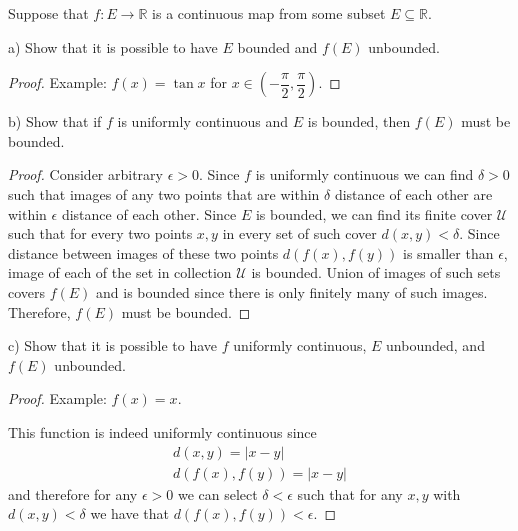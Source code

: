 \documentclass{article}
\newcommand{\R}{\mathbb{R}}
\begin{document}
\begin{tcolorbox}
Suppose that $f : E \to \R$ is a continuous map from some subset $E \subseteq \R$.

a) Show that it is possible to have $E$ bounded and $f(E)$ unbounded.
\end{tcolorbox}

\begin{proof}

Example: $f(x) = \tan x$ for $x \in \left( -\dfrac{\pi}{2}, \dfrac{\pi}{2} \right)$.

\end{proof}

\begin{tcolorbox}
b) Show that if $f$ is uniformly continuous and $E$ is bounded, then $f(E)$ must be bounded.
\end{tcolorbox}

\begin{proof}

Consider arbitrary $\epsilon>0$.
Since $f$ is uniformly continuous we can find $\delta>0$ such that images of any two points that are within $\delta$ distance of each other are within $\epsilon$ distance of each other.
Since $E$ is bounded, we can find its finite cover $\mathcal{U}$ such that for every two points $x,y$ in every set of such cover $d(x,y) < \delta$.
Since distance between images of these two points $d(f(x), f(y))$ is smaller than $\epsilon$, image of each of the set in collection $\mathcal{U}$ is bounded.
Union of images of such sets covers $f(E)$ and is bounded since there is only finitely many of such images.
Therefore, $f(E)$ must be bounded.

\end{proof}

\begin{tcolorbox}
c) Show that it is possible to have $f$ uniformly continuous, $E$ unbounded, and $f(E)$ unbounded.
\end{tcolorbox}

\begin{proof}

Example: $f(x) = x$.

This function is indeed uniformly continuous since
\begin{gather*}
    d(x,y) = |x-y| \\
    d(f(x),f(y)) = |x-y|    
\end{gather*}
and therefore for any $\epsilon > 0$ we can select $\delta < \epsilon$ such that for any $x, y$ with $d(x,y)<\delta$ we have that $d(f(x),f(y)) < \epsilon$.

\end{proof}
\end{document}
